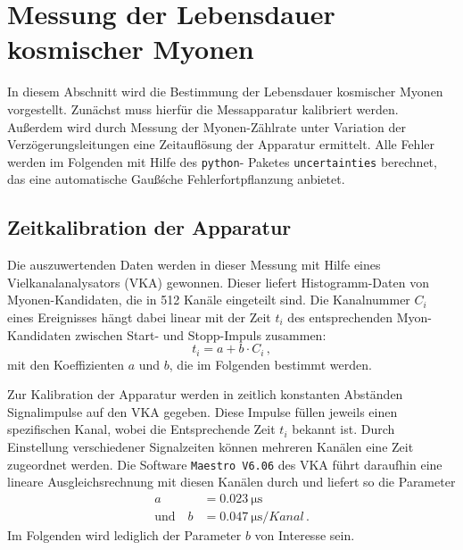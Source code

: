 \section{Messung der Lebensdauer kosmischer Myonen}
\label{sec:messung}
In diesem Abschnitt wird die Bestimmung der Lebensdauer kosmischer Myonen
vorgestellt.
Zunächst muss hierfür die Messapparatur kalibriert werden.
Außerdem wird durch Messung der Myonen-Zählrate unter Variation der
Verzögerungsleitungen eine Zeitauflösung der Apparatur ermittelt.
Alle Fehler werden im Folgenden mit Hilfe des \texttt{python}-
Paketes \texttt{uncertainties} berechnet, das eine automatische
Gauß\'sche Fehlerfortpflanzung anbietet.

\subsection{Zeitkalibration der Apparatur}
\label{subsec:kalibration}
Die auszuwertenden Daten werden in dieser Messung mit Hilfe eines
Vielkanalanalysators (VKA) gewonnen.
Dieser liefert Histogramm-Daten von Myonen-Kandidaten, die in \num{512} Kanäle
eingeteilt sind.
Die Kanalnummer $C_i$ eines Ereignisses hängt dabei linear mit der
Zeit $t_i$ des entsprechenden Myon-Kandidaten zwischen Start- und
Stopp-Impuls zusammen:
\begin{equation}
    t_i = a + b \cdot C_i\,,
\end{equation}
mit den Koeffizienten $a$ und $b$, die im Folgenden bestimmt werden.

Zur Kalibration der Apparatur werden in zeitlich konstanten Abständen
Signalimpulse auf den VKA gegeben.
Diese Impulse füllen jeweils einen spezifischen Kanal, wobei die Entsprechende
Zeit $t_i$ bekannt ist.
Durch Einstellung verschiedener Signalzeiten können mehreren Kanälen eine
Zeit zugeordnet werden.
Die Software \texttt{Maestro V6.06} des VKA führt daraufhin eine lineare Ausgleichsrechnung mit diesen
Kanälen durch und liefert so die Parameter
\begin{align*}
     a &= \SI{0.023}{\micro \second}\\
     \text{und} \quad b &= \SI[per-mode=fraction]{0.047}{\micro \second \per {Kanal}} \,.
 \end{align*}
 Im Folgenden wird lediglich der Parameter $b$ von Interesse sein.

